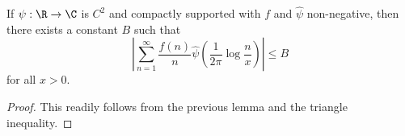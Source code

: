 \begin{corollary}
\label{crude-upper-bound}
\leanok
If $\psi: \R \to \C$ is $C^2$ and compactly supported with $f$ and $\hat \psi$ non-negative, then there exists a constant $B$ such that
  $$ |\sum_{n=1}^\infty \frac{f(n)}{n} \hat \psi( \frac{1}{2\pi} \log \frac{n}{x} )| \leq B$$
  for all $x > 0$.
\end{corollary}
\begin{proof}
\leanok
This readily follows from the previous lemma and the triangle inequality.
\end{proof}
